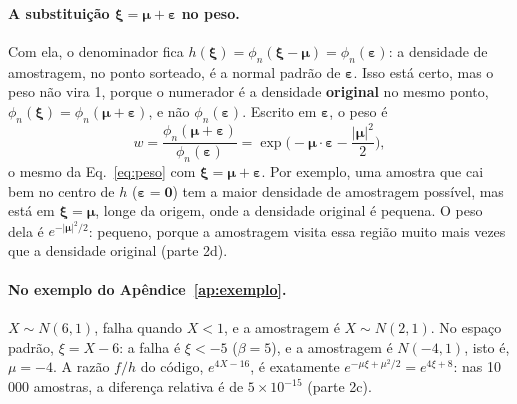 \documentclass[11pt,a4paper]{article}
\newcommand{\xib}{\bm\xi}
\begin{document}
\paragraph{A substituição $\xib = \bm\mu + \bm\varepsilon$ no peso.} Com ela, o denominador fica
$h(\xib) = \phi_n(\xib - \bm\mu) = \phi_n(\bm\varepsilon)$: a densidade de amostragem, no ponto sorteado, é a normal
padrão de $\bm\varepsilon$. Isso está certo, mas o peso não vira 1, porque o numerador é a densidade \textbf{original} no
mesmo ponto, $\phi_n(\xib) = \phi_n(\bm\mu + \bm\varepsilon)$, e não $\phi_n(\bm\varepsilon)$. Escrito em
$\bm\varepsilon$, o peso é
\begin{equation}
  w = \frac{\phi_n(\bm\mu + \bm\varepsilon)}{\phi_n(\bm\varepsilon)}
  = \exp\Big(-\bm\mu\cdot\bm\varepsilon - \frac{|\bm\mu|^2}{2}\Big),
  \label{eq:pesoeps}
\end{equation}
o mesmo da Eq.~\eqref{eq:peso} com $\xib = \bm\mu + \bm\varepsilon$. Por exemplo, uma amostra que cai bem no centro de
$h$ ($\bm\varepsilon = \bm 0$) tem a maior densidade de amostragem possível, mas está em $\xib = \bm\mu$, longe da
origem, onde a densidade original é pequena. O peso dela é $e^{-|\bm\mu|^2/2}$: pequeno, porque a amostragem visita essa
região muito mais vezes que a densidade original (parte 2d).

\paragraph{No exemplo do Apêndice~\ref{ap:exemplo}.} $X \sim N(6, 1)$, falha quando $X < 1$, e a amostragem é
$X \sim N(2, 1)$. No espaço padrão, $\xi = X - 6$: a falha é $\xi < -5$ ($\beta = 5$), e a amostragem é $N(-4, 1)$, isto
é, $\mu = -4$. A razão $f/h$ do código, $e^{4X - 16}$, é exatamente $e^{-\mu\xi + \mu^2/2} = e^{4\xi + 8}$: nas 10\,000
amostras, a diferença relativa é de $5\times10^{-15}$ (parte 2c).
\end{document}
